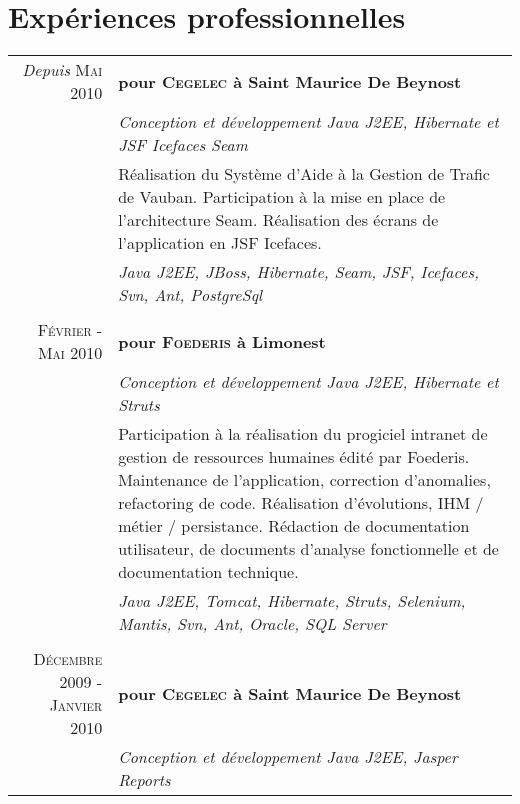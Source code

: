 \documentclass[a4paper,10pt]{article}
\begin{document}
\section{Expériences professionnelles}
\begin{supertabular}{r|p{11cm}}
  \emph{Depuis} \textsc{Mai 2010}
  & \textbf{pour \textsc{Cegelec} à Saint Maurice De Beynost}                                                            \\ 
  & \emph{Conception et développement Java J2EE, Hibernate et JSF Icefaces Seam}                                         \\
  & \footnotesize{Réalisation du Système d'Aide à la Gestion de Trafic de Vauban. Participation à la mise en place de l'architecture Seam. Réalisation des écrans de l'application en JSF Icefaces.}                 \\
  & \emph{Java J2EE, JBoss, Hibernate, Seam, JSF, Icefaces,  Svn, Ant, PostgreSql}                               \\
                                                                                                     \\
  \textsc{Février - Mai 2010}
  & \textbf{pour \textsc{Foederis} à Limonest}                                                                           \\ 
  & \emph{Conception et développement Java J2EE, Hibernate et Struts}                                                    \\
  & \footnotesize{Participation à la réalisation du progiciel intranet de gestion de ressources humaines édité par Foederis. Maintenance de l'application, correction d'anomalies, refactoring de code. Réalisation d'évolutions, IHM / métier / persistance. Rédaction de documentation utilisateur, de documents d'analyse fonctionnelle et de documentation technique.}   \\
  & \emph{Java J2EE, Tomcat, Hibernate, Struts,  Selenium, Mantis, Svn, Ant, Oracle, SQL Server}                 \\
                                                                                                     \\
  \textsc{Décembre 2009 - Janvier 2010}                                                              
  & \textbf{pour \textsc{Cegelec} à Saint Maurice De Beynost}                                                            \\ 
  & \emph{Conception et développement Java J2EE, Jasper Reports}                                                         \\

\end{supertabular}
\end{document}

